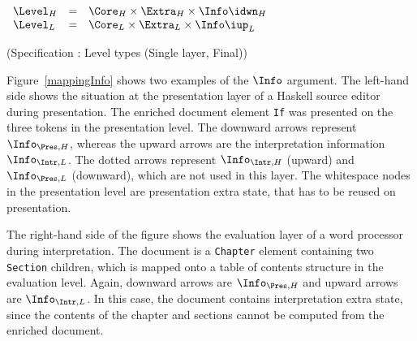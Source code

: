 \begin{small}
 \label{spec:levelSingleFinal}
\(\begin{array}{lcll} \label{spec:extraStateSL}
\Level_{H} & = & \Core_{H} \times \Extra_{H} \times \Info\idwn_{H}\\
\Level_{L} & = & \Core_{L} \times \Extra_{L} \times \Info\iup_{L}\\
\end{array}\)\end{small}
\begin{center}(Specification \thespecification: Level types (Single layer, Final))\end{center}\vspace{1em}

\bc
Figure~\ref{mappingInfo} shows two examples of the $\Info$ argument. The left-hand side shows the situation at the presentation layer of a Haskell source editor during presentation.  The enriched document element \verb|If|  was presented on the three tokens in the presentation level. The downward arrows represent $\Info_{\Pres,H}$, whereas the upward arrows are the interpretation information $\Info_{\Intr, L}$. The dotted arrows represent $\Info_{\Intr,H}$ (upward) and $\Info_{\Pres,L}$ (downward), which are not used in this layer. The whitespace nodes in the presentation level are presentation extra state, that has to be reused on presentation. 

The right-hand side of the figure shows the evaluation layer of a word processor during interpretation. The document is a \verb|Chapter| element containing two \verb|Section| children, which is mapped onto a table of contents structure in the evaluation level. Again, downward arrows are $\Info_{\Pres,H}$ and upward arrows are $\Info_{\Intr,L}$.  In this case, the document contains interpretation extra state, since the contents of the chapter and sections cannot be computed from the enriched document.  

